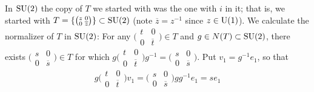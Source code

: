 \documentclass[../../rtnotes.tex]{subfiles}
\begin{document}
In $\operatorname{SU}(2)$ the copy of $T$ we started with was the one with $i$ in it; that is, we started with $T = \{\bigl(\!\begin{smallmatrix}
    z & 0 \\ 0 & \overline z
\end{smallmatrix}\!\bigr)\}\subset \operatorname{SU}(2)$ (note $\overline z = z^{-1}$ since $z\in \operatorname{U}(1)$). We calculate the normalizer of $T$ in $\operatorname{SU}(2)$: For any $\bigl(\!\begin{smallmatrix}
    t & 0 \\ 0 & \overline t
\end{smallmatrix}\!\bigr)\in T$ and $g\in N(T)\subset \operatorname{SU}(2)$, there exists $\bigl(\!\begin{smallmatrix}
    s & 0 \\ 0 & \overline s
\end{smallmatrix}\!\bigr)\in T$ for which $g\bigl(\!\begin{smallmatrix}
    t & 0 \\ 0 & \overline t
\end{smallmatrix}\!\bigr)g^{-1} = \bigl(\!\begin{smallmatrix}
    s & 0 \\ 0 & \overline s
\end{smallmatrix}\!\bigr)$. Put $v_1 = g^{-1}e_1$, so that 
\[g\bigl(\!\begin{smallmatrix}
    t & 0 \\ 0 & \overline t
\end{smallmatrix}\!\bigr)v_1 = \bigl(\!\begin{smallmatrix}
    s & 0 \\ 0 & \overline s
\end{smallmatrix}\!\bigr)gg^{-1}e_1 = se_1\]
\end{document}
